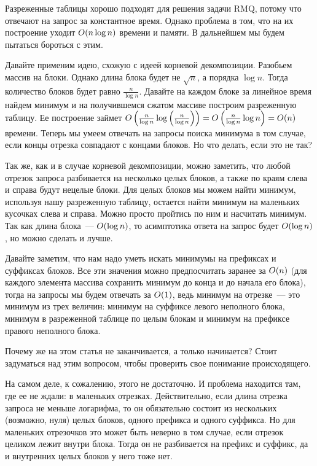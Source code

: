 Разреженные таблицы хорошо подходят для решения задачи RMQ, потому что отвечают на запрос за константное время. Однако проблема в том, что на их построение уходит $O(n \log n)$ времени и памяти. В дальнейшем мы будем пытаться бороться с этим.

Давайте применим идею, схожую с идеей корневой декомпозиции. Разобьем массив на блоки. Однако длина блока будет не $\sqrt{n}$, а порядка $\log n$. Тогда количество блоков будет равно $\frac{n}{\log n}$. Давайте на каждом блоке за линейное время найдем минимум и на получившемся сжатом массиве построим разреженную таблицу. Ее построение займет $O\left(\frac{n}{\log n} \log \left( \frac{n}{\log n} \right)\right) = O\left( \frac{n}{\log n} \log n \right) = O(n)$ времени. Теперь мы умеем отвечать на запросы поиска минимума в том случае, если концы отрезка совпадают с концами блоков. Но что делать, если это не так?

Так же, как и в случае корневой декомпозиции, можно заметить, что любой отрезок запроса разбивается на несколько целых блоков, а также по краям слева и справа будут нецелые блоки. Для целых блоков мы можем найти минимум, используя нашу разреженную таблицу, остается найти минимум на маленьких кусочках слева и справа. Можно просто пройтись по ним и насчитать минимум. Так как длина блока~--- $O(\log n)$, то асимптотика ответа на запрос будет $O(\log n)$, но можно сделать и лучше.

Давайте заметим, что нам надо уметь искать минимумы на префиксах и суффиксах блоков. Все эти значения можно предпосчитать заранее за $O(n)$ (для каждого элемента массива сохранить минимум до конца и до начала его блока), тогда на запросы мы будем отвечать за $O(1)$, ведь минимум на отрезке~--- это минимум из трех величин: минимум на суффиксе левого неполного блока, минимум в разреженной таблице по целым блокам и минимум на префиксе правого неполного блока.

\begin{exercise}
Почему же на этом статья не заканчивается, а только начинается?
Стоит задуматься над этим вопросом, чтобы проверить свое понимание происходящего.
\end{exercise}

На самом деле, к сожалению, этого не достаточно. И проблема находится там, где ее не ждали: в маленьких отрезках. Действительно, если длина отрезка запроса не меньше логарифма, то он обязательно состоит из нескольких (возможно, нуля) целых блоков, одного префикса и одного суффикса. Но для маленьких отрезочков это может быть неверно в том случае, если отрезок целиком лежит внутри блока. Тогда он не разбивается на префикс и суффикс, да и внутренних целых блоков у него тоже нет.

